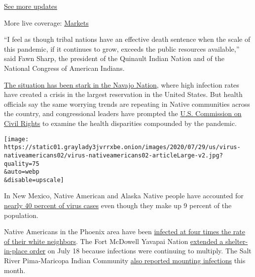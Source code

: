 \href{https://www.nytimes3xbfgragh.onion/2020/08/04/world/coronavirus-cases.html?action=click\&pgtype=Article\&state=default\&region=MAIN_CONTENT_1\&context=storylines_live_updates}{See
more updates}

More live coverage:
\href{https://www.nytimes3xbfgragh.onion/live/2020/08/04/business/stock-market-today-coronavirus?action=click\&pgtype=Article\&state=default\&region=MAIN_CONTENT_1\&context=storylines_live_updates}{Markets}

``I feel as though tribal nations have an effective death sentence when
the scale of this pandemic, if it continues to grow, exceeds the public
resources available,'' said Fawn Sharp, the president of the Quinault
Indian Nation and of the National Congress of American Indians.

\href{https://www.nytimes3xbfgragh.onion/2020/04/09/us/coronavirus-navajo-nation.html}{The
situation has been stark in the Navajo Nation}, where high infection
rates have created a crisis in the largest reservation in the United
States. But health officials say the same worrying trends are repeating
in Native communities across the country, and congressional leaders have
prompted the
\href{https://www.warren.senate.gov/newsroom/press-releases/us-commission-on-civil-rights-agrees-to-warren-haaland-request-to-update-broken-promises-report-and-examine-pandemic-impacts-on-indian-country}{U.S.
Commission on Civil Rights} to examine the health disparities compounded
by the pandemic.

\texttt{[image: https://static01.graylady3jvrrxbe.onion/images/2020/07/29/us/virus-nativeamericans02/virus-nativeamericans02-articleLarge-v2.jpg?quality=75\\\&auto=webp\\\&disable=upscale]}

In New Mexico, Native American and Alaska Native people have accounted
for \href{https://cvprovider.nmhealth.org/public-dashboard.html}{nearly
40 percent of virus cases} even though they make up 9 percent of the
population.

Native Americans in the Phoenix area have been
\href{https://phdata.maricopa.gov/Dashboard/e10a16d8-921f-4aac-b921-26d95e638a45?e=false\&vo=viewonly}{infected
at four times the rate of their white neighbors}. The Fort McDowell
Yavapai Nation
\href{https://www.fmyn.org/tribal-member-letter-extending-shelter-in-place-order-and-tribal-govt-closure/}{extended
a shelter-in-place order} on July 18 because infections were continuing
to multiply. The Salt River Pima-Maricopa Indian Community
\href{https://oan.srpmic-nsn.gov/archives/2020/PDFs/OAN_JULY162020_FINAL.pdf}{also
reported mounting infections} this month.

